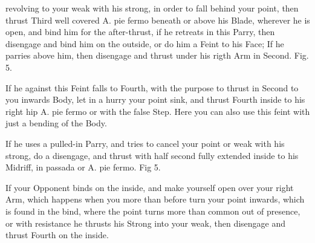 \newpage


\newpage


revolving to your weak with his strong, in order to fall behind your
point, then thrust Third well covered A. pie fermo beneath or above
his Blade, wherever he is open, and bind him for the after-thrust, if
he retreats in this Parry, then disengage and bind him on the outside,
or do him a Feint to his Face; If he parries above him, then disengage
and thrust under his rigth Arm in Second. Fig. 5.


\exercise{}
If he against this Feint falls to Fourth, with the purpose to thrust
in Second to you inwards Body, let in a hurry your point sink, and
thrust Fourth inside to his right hip A. pie fermo or with the false
Step. Here you can also use this feint with just a bending of the Body.

\exercise{}
If he uses a pulled-in Parry, and tries to cancel your point or weak
with his strong, do a disengage, and thrust with half second fully
extended inside to his Midriff, in passada or A. pie fermo. Fig 5.

If your Opponent binds on the inside, and make yourself open over your
right Arm, which happens when you more than before turn your point
inwards, which is found in the bind, where the point turns more than
common out of presence, or with resistance he thrusts his Strong into
your weak, then disengage and thrust Fourth on the inside.

